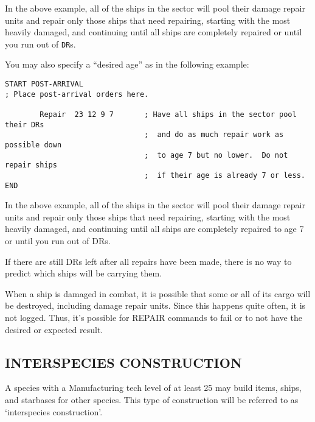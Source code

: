 \documentclass[10pt,titlepage]{article}
\begin{document}
In the above example, all of the ships in the sector will pool their damage
repair units and repair only those ships that need repairing, starting with the
most heavily damaged, and continuing until all ships are completely repaired or
until you run out of \texttt{DR}s.

You may also specify a ``desired age'' as in the following example:

\begin{verbatim}
START POST-ARRIVAL
; Place post-arrival orders here.

        Repair  23 12 9 7       ; Have all ships in the sector pool their DRs
                                ;  and do as much repair work as possible down
                                ;  to age 7 but no lower.  Do not repair ships
                                ;  if their age is already 7 or less.
END\end{verbatim} 


In the above example, all of the ships in the sector will pool their damage
repair units and repair only those ships that need repairing, starting with the
most heavily damaged, and continuing until all ships are completely repaired to
age 7 or until you run out of DRs.

If there are still DRs left after all repairs have been made, there is no way
to predict which ships will be carrying them.


\begin{importantnote}
	When a ship is damaged in combat, it is possible that some or
	all of its cargo will be destroyed, including damage repair
	units.  Since this happens quite often, it is not logged.  Thus,
	it's possible for REPAIR commands to fail or to not have the
	desired or expected result.
\end{importantnote}

\subsection{INTERSPECIES CONSTRUCTION}

A species with a Manufacturing tech level of at least 25 may build items,
ships, and starbases for other species.  This type of construction will be
referred to as `interspecies construction'.
\end{document}
